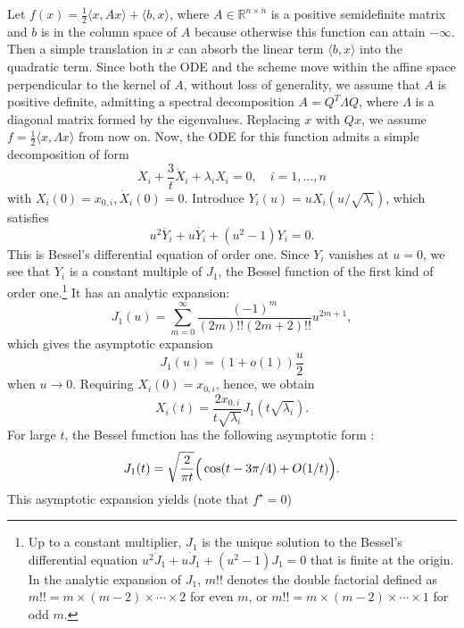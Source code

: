 \documentclass[twoside,11pt]{article}
\newcommand{\R}{\mathbb{R}}
\newcommand{\goto}{\rightarrow}
\begin{document}
Let $f(x) = \frac12\langle x, Ax \rangle + \langle b, x \rangle$, where $A \in \R^{n \times n}$ is a positive semidefinite matrix and $b$ is in the column space of $A$ because otherwise this function can attain $-\infty$. Then a simple translation in $x$ can absorb the linear term $\langle b, x\rangle$ into the quadratic term. Since both the ODE and the scheme move within the affine space perpendicular to the kernel of $A$, without loss of generality, we assume that $A$ is positive definite, admitting a spectral decomposition $A = Q^T\Lambda Q$, where $\Lambda$ is a diagonal matrix formed by the eigenvalues. Replacing $x$ with $Qx$, we assume $f = \frac12 \langle x, \Lambda x \rangle$ from now on. Now, the ODE for this function admits a simple decomposition of form
\begin{equation}\nonumber
\ddot X_i + \frac{3}{t}\dot X_i + \lambda_i X_i = 0, \quad i=1,\ldots, n
\end{equation}
with $X_i(0) = x_{0,i}, \dot X_i(0) = 0$. Introduce $Y_i(u) = uX_i(u/\sqrt{\lambda_i})$, which satisfies
\begin{equation}\nonumber
u^2\ddot{Y_i} + u\dot{Y_i} + (u^2 - 1)Y_i=0.
\end{equation}
This is Bessel's differential equation of order one. Since $Y_i$ vanishes at $u=0$, we see that $Y_i$ is a constant multiple of $J_1$, the Bessel function of the first kind of order one.\footnote{Up to a constant multiplier, $J_1$ is the unique solution to the Bessel's differential equation $u^2 \ddot J_1 + u\dot J_1 + (u^2-1)J_1 = 0$ that is finite at the origin. In the analytic expansion of $J_1$, $m !!$ denotes the double factorial defined as $m !! = m \times (m-2) \times \cdots \times 2$ for even $m$, or $m !! = m \times (m-2) \times \cdots \times 1$ for odd $m$.}  It has an analytic expansion:
\[
J_1(u) =\sum_{m=0}^{\infty} \frac{(-1)^m}{(2m)!!(2m+2)!!}u^{2m+1},
\]
which gives the asymptotic expansion 
\[
J_1(u) = (1 + o(1))\frac{u}2
\]
when $u\goto 0$. Requiring $X_i(0) = x_{0,i}$, hence, we obtain
\begin{equation}\label{eq:bessel_present}
X_i(t) = \frac{2x_{0,i}}{t\sqrt{\lambda_i}}J_1(t\sqrt{\lambda_i}).
\end{equation}
For large $t$, the Bessel function has the following asymptotic form \citep[see e.g.][]{besselbook}:
\begin{equation}\label{eq:bessel-large}
J_1(t) = \sqrt{\frac{2}{\pi t}} \Big{(} \cos(t - 3\pi/4) + O(1/t)\Big{)}.
\end{equation}
This asymptotic expansion yields (note that $f^\star = 0$)
\end{document}
